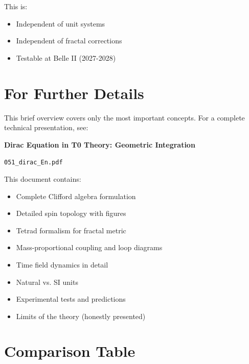 	This is:
	\begin{itemize}
		\item Independent of unit systems
		\item Independent of fractal corrections
		\item Testable at Belle II (2027-2028)
	\end{itemize}
	
	\section{For Further Details}
	
	This brief overview covers only the most important concepts. For a complete 
	technical presentation, see:
	
	\begin{tcolorbox}[colback=blue!5!white,colframe=blue!75!black,title=Main Document]
		\textbf{Dirac Equation in T0 Theory: Geometric Integration}
		
		\texttt{051\_dirac\_En.pdf}
		
		\vspace{0.3cm}
		
		This document contains:
		\begin{itemize}
			\item Complete Clifford algebra formulation
			\item Detailed spin topology with figures
			\item Tetrad formalism for fractal metric
			\item Mass-proportional coupling and loop diagrams
			\item Time field dynamics in detail
			\item Natural vs. SI units
			\item Experimental tests and predictions
			\item Limits of the theory (honestly presented)
		\end{itemize}
	\end{tcolorbox}
	
	\section{Comparison Table}
	
